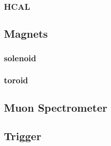\subsubsection{HCAL} \label{sec:HCAL} 

\subsection{Magnets} \label{sec:Magnets}

\subsubsection{solenoid} \label{sec:solenoid} 

\subsubsection{toroid} \label{sec:toroid} 

\subsection{Muon Spectrometer} \label{sec:Musyst}
 
\subsection{Trigger} \label{sec:Trigger}
